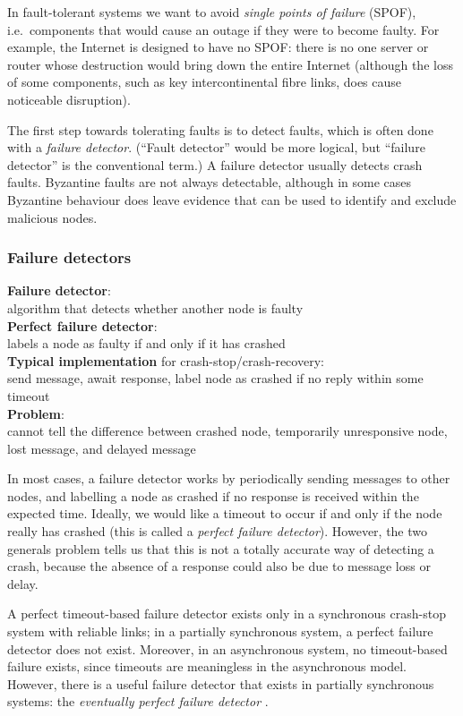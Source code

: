 In fault-tolerant systems we want to avoid \emph{single points of failure} (SPOF), i.e.\ components that would cause an outage if they were to become faulty.
For example, the Internet is designed to have no SPOF: there is no one server or router whose destruction would bring down the entire Internet (although the loss of some components, such as key intercontinental fibre links, does cause noticeable disruption).

The first step towards tolerating faults is to detect faults, which is often done with a \emph{failure detector}.
(``Fault detector'' would be more logical, but ``failure detector'' is the conventional term.)
A failure detector usually detects crash faults.
Byzantine faults are not always detectable, although in some cases Byzantine behaviour does leave evidence that can be used to identify and exclude malicious nodes.

\begin{frame}
    \label{s:failure-detector}
    \frametitle{Failure detectors}
    \textbf{Failure detector}:\\algorithm that detects whether another node is faulty\\[1em]
    \textbf{Perfect failure detector}:\\labels a node as faulty if and only if it has crashed\\[1em]\pause
    \textbf{Typical implementation} for crash-stop/crash-recovery:\\
    send message, await response, label node as crashed if no reply within some timeout\\[1em]\pause
    \textbf{Problem}:\\cannot tell the difference between crashed node, temporarily
    unresponsive node, lost message, and delayed message\\[1em]
\end{frame}
\label{l:failure-detector}

In most cases, a failure detector works by periodically sending messages to other nodes, and labelling a node as crashed if no response is received within the expected time.
Ideally, we would like a timeout to occur if and only if the node really has crashed (this is called a \emph{perfect failure detector}).
However, the two generals problem tells us that this is not a totally accurate way of detecting a crash, because the absence of a response could also be due to message loss or delay.

A perfect timeout-based failure detector exists only in a synchronous crash-stop system with reliable links; in a partially synchronous system, a perfect failure detector does not exist.
Moreover, in an asynchronous system, no timeout-based failure exists, since timeouts are meaningless in the asynchronous model.
However, there is a useful failure detector that exists in partially synchronous systems: the \emph{eventually perfect failure detector} \citep{Chandra:1996}.

